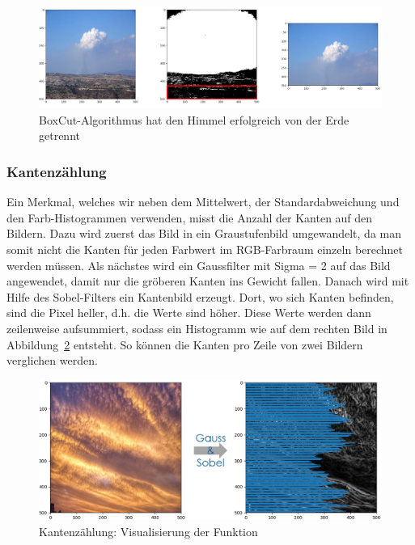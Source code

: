 \documentclass[a4,german]{article}
\begin{document}
\begin{figure}[h!]
\centering
\includegraphics[width=1.1\textwidth]{boxAlg} %
\caption{BoxCut-Algorithmus hat den Himmel erfolgreich von der Erde getrennt}
\label{fig:boxAlg}
\end{figure}
\subsubsection{Kantenzählung}
\label{sec:kanten}
Ein Merkmal, welches wir neben dem Mittelwert, der Standardabweichung und den Farb-Histogrammen verwenden, misst die Anzahl der Kanten auf den Bildern.
Dazu wird zuerst das Bild in ein Graustufenbild umgewandelt, da man somit nicht die Kanten für jeden Farbwert im RGB-Farbraum einzeln berechnet werden müssen. Als nächstes wird ein Gaussfilter mit Sigma = 2 auf das Bild angewendet, damit nur die gröberen Kanten ins Gewicht fallen. Danach wird mit Hilfe des Sobel-Filters ein Kantenbild erzeugt.
Dort, wo sich Kanten befinden, sind die Pixel heller, d.h. die Werte sind höher.
Diese Werte werden dann zeilenweise aufsummiert, sodass ein Histogramm wie auf dem rechten Bild in Abbildung~\ref{fig:kaz} entsteht. So können die Kanten pro Zeile von zwei Bildern verglichen werden.

\begin{figure}[h!]
\centering
\includegraphics[width=\textwidth]{Kantenzaehlung.png}
\caption{Kantenzählung: Visualisierung der Funktion}
    \label{fig:kaz}
\end{figure}
\end{document}
